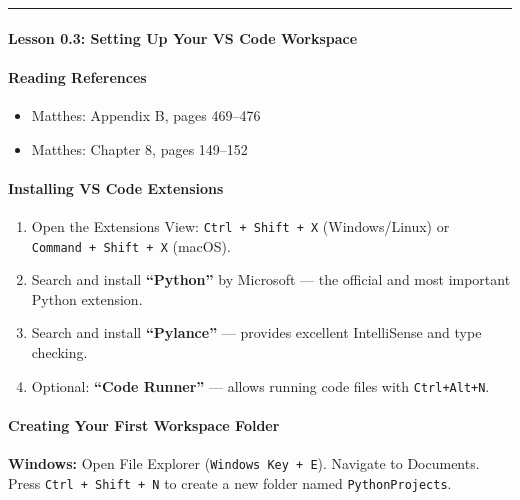 \documentclass[
  justified,
  openright,
]{tufte-book}
\let\subsection\paragraph
\let\paragraph\paragraph
\let\subsection\paragraph
\let\paragraph\paragraph
\providecommand{\tightlist}{%
  \setlength{\itemsep}{0pt}\setlength{\parskip}{0pt}}
\begin{document}
\begin{center}\rule{0.5\linewidth}{0.5pt}\end{center}

\subsection{Lesson 0.3: Setting Up Your VS Code
Workspace}\label{lesson-0.3-setting-up-your-vs-code-workspace-1}

\subsection{Reading References}\label{reading-references-2}

\begin{itemize}
\tightlist
\item
  Matthes: Appendix B, pages 469--476
\item
  Matthes: Chapter 8, pages 149--152
\end{itemize}

\subsection{Installing VS Code
Extensions}\label{installing-vs-code-extensions}

\begin{enumerate}
\def\labelenumi{\arabic{enumi}.}
\tightlist
\item
  Open the Extensions View: \texttt{Ctrl\ +\ Shift\ +\ X}
  (Windows/Linux) or \texttt{Command\ +\ Shift\ +\ X} (macOS).
\item
  Search and install \textbf{``Python''} by Microsoft --- the official
  and most important Python extension.
\item
  Search and install \textbf{``Pylance''} --- provides excellent
  IntelliSense and type checking.
\item
  Optional: \textbf{``Code Runner''} --- allows running code files with
  \texttt{Ctrl+Alt+N}.
\end{enumerate}

\subsection{Creating Your First Workspace
Folder}\label{creating-your-first-workspace-folder}

\textbf{Windows:} Open File Explorer (\texttt{Windows\ Key\ +\ E}).
Navigate to Documents. Press \texttt{Ctrl\ +\ Shift\ +\ N} to create a
new folder named \texttt{PythonProjects}.
\end{document}
